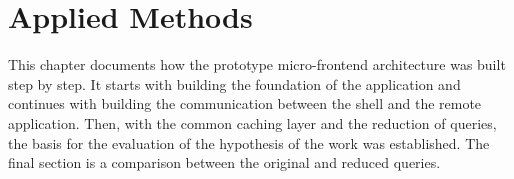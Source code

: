 \chapter{Applied Methods}\label{chapter:applied-methods}

This chapter documents how the prototype micro-frontend architecture was built step by step. It starts with building the foundation of the application and continues with building the communication between the shell and the remote application. Then, with the common caching layer and the reduction of queries, the basis for the evaluation of the hypothesis of the work was established. The final section is a comparison between the original and reduced queries.









